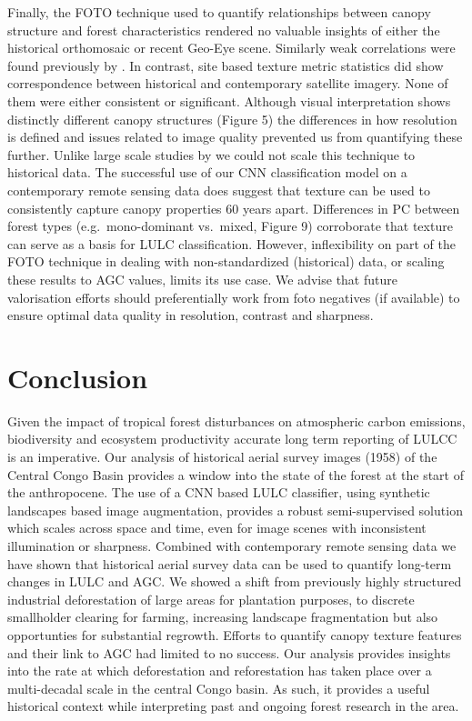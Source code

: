 \documentclass[remote sensing,article,submit,moreauthors,pdftex]{mdpi}
\begin{document}
Finally, the FOTO technique used to quantify relationships between
canopy structure and forest characteristics rendered no valuable
insights of either the historical orthomosaic or recent Geo-Eye scene.
Similarly weak correlations were found previously by
\citet{solorzano2018}. In contrast, site based texture metric statistics
did show correspondence between historical and contemporary satellite
imagery. None of them were either consistent or significant. Although
visual interpretation shows distinctly different canopy structures
(Figure 5) the differences in how resolution is defined and issues
related to image quality prevented us from quantifying these further.
Unlike large scale studies by \citet{Ploton2012} we could not scale this
technique to historical data. The successful use of our CNN
classification model on a contemporary remote sensing data does suggest
that texture can be used to consistently capture canopy properties 60
years apart. Differences in PC between forest types (e.g.~mono-dominant
vs.~mixed, Figure 9) corroborate that texture can serve as a basis for
LULC classification. However, inflexibility on part of the FOTO
technique in dealing with non-standardized (historical) data, or scaling
these results to AGC values, limits its use case. We advise that future
valorisation efforts should preferentially work from foto negatives (if
available) to ensure optimal data quality in resolution, contrast and
sharpness.

\hypertarget{conclusion}{%
\section{Conclusion}\label{conclusion}}

Given the impact of tropical forest disturbances on atmospheric carbon
emissions, biodiversity and ecosystem productivity accurate long term
reporting of LULCC is an imperative. Our analysis of historical aerial
survey images (1958) of the Central Congo Basin provides a window into
the state of the forest at the start of the anthropocene. The use of a
CNN based LULC classifier, using synthetic landscapes based image
augmentation, provides a robust semi-supervised solution which scales
across space and time, even for image scenes with inconsistent
illumination or sharpness. Combined with contemporary remote sensing
data we have shown that historical aerial survey data can be used to
quantify long-term changes in LULC and AGC. We showed a shift from
previously highly structured industrial deforestation of large areas for
plantation purposes, to discrete smallholder clearing for farming,
increasing landscape fragmentation but also opportunties for substantial
regrowth. Efforts to quantify canopy texture features and their link to
AGC had limited to no success. Our analysis provides insights into the
rate at which deforestation and reforestation has taken place over a
multi-decadal scale in the central Congo basin. As such, it provides a
useful historical context while interpreting past and ongoing forest
research in the area.
\end{document}

